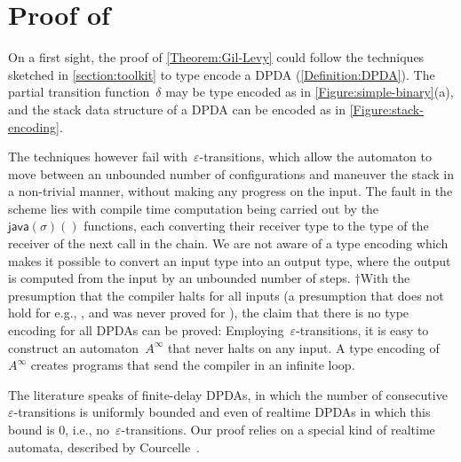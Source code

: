 \documentclass[a4paper,USenglish]{lipics-v2016}
\numberwithin{equation}{section}
\numberwithin{figure}{section}
\def\ReplaceInThesis#1#2{#1}
\begin{document}
\section{Proof of }
\label{section:proof}
On a first sight, the proof of \cref{Theorem:Gil-Levy} could follow the techniques
  sketched in \cref{section:toolkit} to type encode a DPDA (\cref{Definition:DPDA}).
  The partial transition function~$δ$ may be type encoded as in \ReplaceInThesis{\cref{Figure:simple-binary}(a)}{\cref{Figure:simple-binary-a}},
and the stack data structure of a DPDA can be encoded as in \cref{Figure:stack-encoding\ReplaceInThesis{}{-b}}.

The techniques however fail with~$ε$-transitions,
  which allow the automaton to move between an unbounded number of
  configurations and maneuver the stack in a non-trivial manner,
  without making any progress on the input.
The fault in the scheme lies with compile time computation being carried out
  by the~$\textsf{java}(σ)()$ functions, each converting
  their receiver type to the type of the receiver of the next call in the chain.
We are not aware of a \Java type encoding which makes
  it possible to convert an input type into an output type, where
  the output is computed from the input by an unbounded number of steps.
  †{With the presumption that the \Java compiler halts for all inputs (a presumption that does
    not hold for e.g., \CC, and was never proved for \Java), the claim that there is no \Java 
    type encoding for all DPDAs can be proved:
    Employing~$ε$-transitions, it is easy to construct an automaton~$A^∞$ that
    never halts on any input.
    A type encoding of~$A^∞$ creates programs that send the compiler in an infinite loop.
  }

The literature speaks of finite-delay DPDAs, in which the number
  of consecutive~$ε$-transitions is uniformly bounded and even of
  realtime DPDAs in which this bound is 0, i.e., no~$ε$-transitions.
Our proof relies on a special kind of realtime automata,
  described by Courcelle~\cite{Courcelle:77}.
\end{document}

